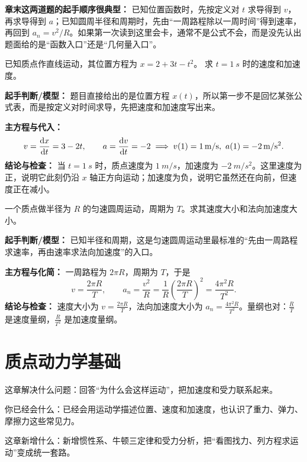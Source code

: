 \documentclass[lang=cn,11pt]{elegantbook}
\newcommand{\chapterroadmap}[3]{%
\begin{introduction}
  \item {\heiti 这章解决什么问题：}#1
  \item {\heiti 你已经会什么：}#2
  \item {\heiti 这章新增什么：}#3
\end{introduction}}
\begin{document}
\begin{note}
\textbf{章末这两道题的起手顺序很典型：} 已知位置函数时，先按定义对 \(t\) 求导得到 \(v\)，再求导得到 \(a\)；已知圆周半径和周期时，先由“一周路程除以一周时间”得到速率，再回到 \(a_n=v^2/R\)。如果第一次读到这里会卡，通常不是公式不会，而是没先认出题面给的是“函数入口”还是“几何量入口”。
\end{note}

\begin{exercise}[]
已知质点作直线运动，其位置方程为 \(x=2+3t-t^2\)。
求 \(t=\SI{1}{s}\) 时的速度和加速度。
\end{exercise}

\begin{solution}
\textbf{起手判断/模型：} 题目直接给出的是位置方程 \(x(t)\)，所以第一步不是回忆某张公式表，而是按定义对时间求导，先把速度和加速度写出来。

\textbf{主方程与代入：}
\[
v=\dv{x}{t}=3-2t,\qquad
a=\dv{v}{t}=-2
\implies
v(1)=\SI{1}{m/s},\ a(1)=\SI{-2}{m/s^2}.
\]
\textbf{结论与检查：} 当 \(t=\SI{1}{s}\) 时，质点速度为 \(\SI{1}{m/s}\)，加速度为 \(\SI{-2}{m/s^2}\)。这里速度为正，说明它此刻仍沿 \(x\) 轴正方向运动；加速度为负，说明它虽然还在向前，但速度正在减小。
\end{solution}

\begin{exercise}[]
一个质点做半径为 \(R\) 的匀速圆周运动，周期为 \(T\)。求其速度大小和法向加速度大小。
\end{exercise}

\begin{solution}
\textbf{起手判断/模型：} 已知半径和周期，这是匀速圆周运动里最标准的“先由一周路程求速率，再由速率求法向加速度”的入口。

\textbf{主方程与化简：} 一周路程为 \(2\pi R\)，周期为 \(T\)，于是
\[
v=\frac{2\pi R}{T},\qquad
a_n=\frac{v^2}{R}
=\frac{1}{R}\left(\frac{2\pi R}{T}\right)^2
=\frac{4\pi^2R}{T^2}.
\]
\textbf{结论与检查：} 速度大小为 \(v=\frac{2\pi R}{T}\)，法向加速度大小为 \(a_n=\frac{4\pi^2R}{T^2}\)。量纲也对：\(\frac{R}{T}\) 是速度量纲，\(\frac{R}{T^2}\) 是加速度量纲。
\end{solution}

\chapter{质点动力学基础}

\chapterroadmap
{回答“为什么会这样运动”，把加速度和受力联系起来。}
{已经会用运动学描述位置、速度和加速度，也认识了重力、弹力、摩擦力这些常见力。}
{新增惯性系、牛顿三定律和受力分析，把“看图找力、列方程求运动”变成统一套路。}
\end{document}

